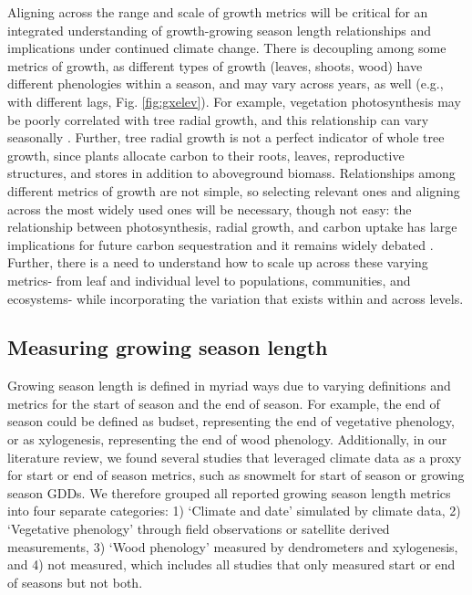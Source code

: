 \documentclass[11pt]{article}
\begin{document}
Aligning across the range and scale of growth metrics will be critical for an integrated understanding of growth-growing season length relationships and implications under continued climate change.  
There is decoupling among some metrics of growth, as different types of growth (leaves, shoots, wood) have different phenologies within a season, and may vary across years, as well (e.g., with different lags, Fig. \ref{fig:gxelev}).
For example, vegetation photosynthesis may be poorly correlated with tree radial growth, and this relationship can vary seasonally \citep{cabon2022cross}. 
Further, tree radial growth is not a perfect indicator of whole tree growth, since plants allocate carbon to their roots, leaves, reproductive structures, and stores in addition to aboveground biomass. 
Relationships among different metrics of growth are not simple, so selecting relevant ones and aligning across the most widely used ones will be necessary, though not easy: the relationship  between photosynthesis, radial growth, and carbon uptake has large implications for future carbon sequestration and it remains widely debated \citep{green2022limits}. 
Further, there is a need to understand how to scale up across these varying metrics- from leaf and individual level to populations, communities, and ecosystems- while incorporating the variation that exists within and across levels.

\subsection*{Measuring growing season length}

Growing season length is defined in myriad ways due to varying definitions and metrics for the start of season and the end of season. For example, the end of season could be defined as budset, representing the end of vegetative phenology, or as xylogenesis, representing the end of wood phenology. Additionally, in our literature review, we found several studies that leveraged climate data as a proxy for start or end of season metrics, such as snowmelt for start of season or growing season GDDs. We therefore grouped all reported growing season length metrics into four separate categories: 1) `Climate and date' simulated by climate data, 2) `Vegetative phenology' through field observations or satellite derived measurements, 3) `Wood phenology' measured by dendrometers and xylogenesis, and 4) not measured, which includes all studies that only measured start or end of seasons but not both. 
\end{document}
